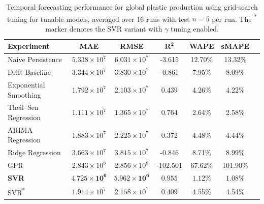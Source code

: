 \begin{table}[!ht]
	\centering
	\caption{
		\centering Temporal forecasting performance for global plastic production using grid-search tuning for tunable models, averaged over 16 runs with test \(n=5\) per run. The \textsuperscript{*} marker denotes the SVR variant with \(\gamma\) tuning enabled.
	}
	\begin{tabular}{@{}lcccccc@{}}
		\toprule
		\textbf{Experiment}    & \textbf{MAE}                   & \textbf{RMSE}                  & $\mathbf{R^2}$     & \textbf{WAPE}       & \textbf{sMAPE}      \\
		\midrule
		Naive Persistence      & \(5.338 \times 10^7\)          & \(6.031 \times 10^7\)          & -3.615             & 12.70\%             & 13.32\%             \\
		Drift Baseline         & \(3.344 \times 10^7\)          & \(3.830 \times 10^7\)          & -0.861             & 7.95\%              & 8.09\%              \\
		Exponential Smoothing  & \(1.792 \times 10^7\)          & \(2.103 \times 10^7\)          & 0.439              & 4.26\%              & 4.22\%              \\
		Theil--Sen Regression  & \(1.111 \times 10^7\)          & \(1.365 \times 10^7\)          & 0.764              & 2.64\%              & 2.58\%              \\
		ARIMA Regression       & \(1.883 \times 10^7\)          & \(2.225 \times 10^7\)          & 0.372              & 4.48\%              & 4.44\%              \\
		Ridge Regression       & \(3.663 \times 10^7\)          & \(3.815 \times 10^7\)          & -0.846             & 8.71\%              & 8.99\%              \\
		GPR                    & \(2.843 \times 10^8\)          & \(2.856 \times 10^8\)          & -102.501           & 67.62\%             & 101.90\%            \\
		\textbf{SVR}           & \(\mathbf{4.725 \times 10^6}\) & \(\mathbf{5.962 \times 10^6}\) & \(\mathbf{0.955}\) & \(\mathbf{1.12}\)\% & \(\mathbf{1.08}\)\% \\
		SVR\textsuperscript{*} & \(1.914 \times 10^7\)          & \(2.158 \times 10^7\)          & 0.409              & 4.55\%              & 4.54\%              \\
		\hline
	\end{tabular}
	\label{tab:global_forecasting_grid_search_metrics}
\end{table}

